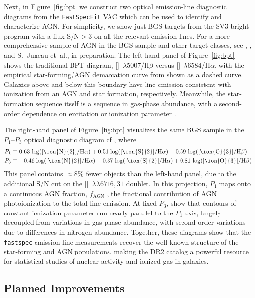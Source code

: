 \documentclass[modern,linenumbers]{aastex702}
\newcommand{\fastspecfit}{\texttt{FastSpecFit}}
\newcommand{\fastspec}{\texttt{fastspec}}
\newcommand{\oiii}{[\ion{O}{3}]}
\newcommand{\nii}{[\ion{N}{2}]}
\newcommand{\sii}{[\ion{S}{2}]}
\newcommand{\ha}{\ensuremath{\mathrm{H}\alpha}}
\newcommand{\hb}{\ensuremath{\mathrm{H}\beta}}
\newcommand{\niilam}{[\ion{N}{2}]~$\lambda6584$}
\newcommand{\oiiilam}{[\ion{O}{3}]~$\lambda5007$}
\newcommand{\siidoublet}{[\ion{S}{2}]~$\lambda\lambda6716,31$}
\begin{document}
Next, in Figure~\ref{fig:bpt} we construct two optical emission-line
diagnostic diagrams from the \fastspecfit{} VAC which can be used to
identify and characterize AGN. For simplicity, we show just BGS
targets from the SV3 bright program with a flux $\mathrm{S/N}>3$ on
all the relevant emission lines. For a more comprehensive sample of
AGN in the BGS sample and other target classes, see \citet{juneau25a},
\citet{siudek25a}, and S.~Juneau et~al., in preparation. The left-hand
panel of Figure~\ref{fig:bpt} shows the traditional BPT
\citep{baldwin81a} diagram, \oiiilam/\hb{} versus \niilam/\ha, with
the empirical star-forming/AGN demarcation curve from
\citet{kauffmann03c} shown as a dashed curve. Galaxies above and below
this boundary have line-emission consistent with ionization from an
AGN and star formation, respectively. Meanwhile, the star-formation
sequence itself is a sequence in gas-phase abundance, with a
second-order dependence on excitation or ionization parameter
\citep[e.g.,][]{kewley02a}.

The right-hand panel of Figure~\ref{fig:bpt} visualizes the same BGS
sample in the $P_1$--$P_3$ optical diagnostic diagram of
\citet{ji20a}, where
\begin{align}
  P_1 &\equiv  0.63\,\log(\text{\nii}/\ha) + 0.51\,\log(\text{\sii}/\ha) + 0.59\,\log(\text{\oiii}/\hb) \label{eq:p1}
\\
  P_3 &\equiv -0.46\,\log(\text{\nii}/\ha) - 0.37\,\log(\text{\sii}/\ha) + 0.81\,\log(\text{\oiii}/\hb) \label{eq:p3}
\end{align}
This panel contains $\approx8\%$ fewer objects than the left-hand
panel, due to the additional S/N cut on the \siidoublet{} doublet. In
this projection, $P_1$ maps onto a continuous AGN fraction,
$f_\mathrm{AGN}$ \citep{ji20a, jin21a}, the fractional contribution of
AGN photoionization to the total line emission. At fixed $P_3$,
\citet{ji20a} show that contours of constant ionization parameter run
nearly parallel to the $P_1$ axis, largely decoupled from variations
in gas-phase abundance, with second-order variations due to
differences in nitrogen abundance. Together, these diagrams show that
the \fastspec{} emission-line measurements recover the well-known
structure of the star-forming and AGN populations, making the DR2
catalog a powerful resource for statistical studies of nuclear
activity and ionized gas in galaxies.

\subsection{Planned Improvements}
\label{ssec:improvements}
\end{document}

